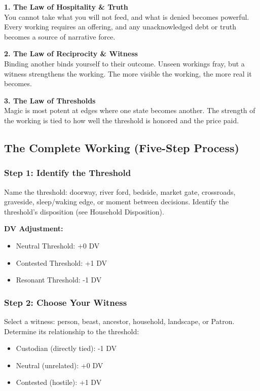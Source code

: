 \documentclass[11pt]{book}
\begin{document}
\textbf{1. The Law of Hospitality \& Truth} \\
You cannot take what you will not feed, and what is denied becomes powerful. Every working requires an offering, and any unacknowledged debt or truth becomes a source of narrative force.

\textbf{2. The Law of Reciprocity \& Witness} \\
Binding another binds yourself to their outcome. Unseen workings fray, but a witness strengthens the working. The more visible the working, the more real it becomes.

\textbf{3. The Law of Thresholds} \\
Magic is most potent at edges where one state becomes another. The strength of the working is tied to how well the threshold is honored and the price paid.

\subsection*{The Complete Working (Five-Step Process)}

\subsubsection*{Step 1: Identify the Threshold}
Name the threshold: doorway, river ford, bedside, market gate, crossroads, graveside, sleep/waking edge, or moment between decisions.  
Identify the threshold's disposition (see Household Disposition).  

\textbf{DV Adjustment:}
\begin{itemize}[noitemsep]
    \item Neutral Threshold: +0 DV
    \item Contested Threshold: +1 DV
    \item Resonant Threshold: -1 DV
\end{itemize}

\subsubsection*{Step 2: Choose Your Witness}
Select a witness: person, beast, ancestor, household, landscape, or Patron. Determine its relationship to the threshold:

\begin{itemize}[noitemsep]
    \item Custodian (directly tied): -1 DV
    \item Neutral (unrelated): +0 DV
    \item Contested (hostile): +1 DV
\end{itemize}
\end{document}
